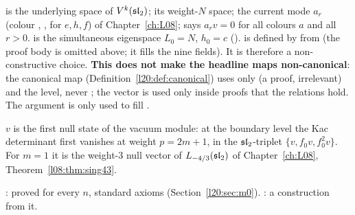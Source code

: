 \begin{dictionary}
 is the underlying space of $V^k(\mathfrak{sl}_2)$;  its weight-$N$ space;
 the current mode $a_r$ (colour , ,  for $e,h,f$) of
Chapter~\ref{ch:L08};  says $a_rv=0$ for all colours $a$ and all $r>0$.
 is the simultaneous eigenspace $L_0=N$, $h_0=c$ ().
 is defined by  from 
(the proof body is omitted above; it fills the nine fields). It is therefore a non-constructive choice.
\textbf{This does not make the headline maps non-canonical}: the canonical map (Definition~\ref{l20:def:canonical})
uses only  (a proof, irrelevant) and the level, never ; the vector is used
only inside proofs that the relations hold. The argument  is only used to fill
.
\end{dictionary}

\begin{physics}
$v$ is the first null state of the vacuum module: at the boundary level the Kac determinant first vanishes
at weight $p=2m+1$, in the $\mathfrak{sl}_2$-triplet $\{v,f_0v,f_0^2v\}$. For $m=1$ it is the weight-3 null vector
of $L_{-4/3}(\mathfrak{sl}_2)$ of Chapter~\ref{ch:L08}, Theorem~\ref{l08:thm:sing43}.
\end{physics}

\begin{status}
: proved for every $n$, standard axioms (Section~\ref{l20:sec:m0}).
: a construction from it.
\end{status}

